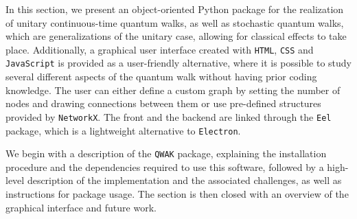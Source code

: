 \documentclass[../../dissertation.tex]{subfiles}
\begin{document}
In this section, we present an object-oriented Python package for the
realization of unitary continuous-time quantum walks, as well as stochastic
quantum walks, which are generalizations of the unitary case, allowing for
classical effects to take place. Additionally, a graphical user interface
created with \texttt{HTML}, \texttt{CSS} and \texttt{JavaScript} is provided as
a user-friendly alternative, where it is possible to study several different
aspects of the quantum walk without having prior coding knowledge. The user can
either define a custom graph by setting the number of nodes and drawing
connections between them or use pre-defined structures provided by
\texttt{NetworkX}. The front and the backend are linked through the
\texttt{Eel} package, which is a lightweight alternative to \texttt{Electron}.\par

We begin with a description of the \texttt{QWAK} package, explaining the
installation procedure and the dependencies required to use this software,
followed by a high-level description of the implementation and the associated
challenges, as well as instructions for package usage. The
section is then closed with an overview of the graphical interface and future
work.
 
\end{document}
